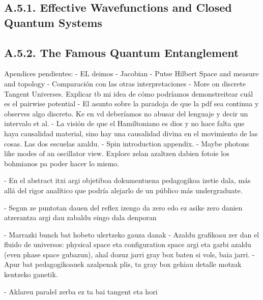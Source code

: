 \documentclass[11pt, a4paper]{article} %
\begin{document}
\subsection*{A.5.1. Effective Wavefunctions and Closed Quantum Systems}

\subsection*{A.5.2. The Famous Quantum Entanglement}

\newpage
Apendices pendientes:
- EL deimos
- Jacobian
- Putse Hilbert Space and measure and topology
- Comparación con las otras interpretaciones
- More on discrete Tangent Universes. Explicar tb mi idea de cómo podríamos demonstreitear cuál es el pairwise potential
- El asunto sobre la paradoja de que la pdf sea continua y observes algo discreto. Ke en vd deberíamos no abusar del lenguaje y decir un intervalo et al.
- La visión de que el Hamiltoniano es dios y no hace falta que haya causalidad material, sino hay una causalidad divina en el movimiento de las cosas. Las dos escuelas azaldu.
- Spin introduction appendix.
- Maybe photons like modes of an oscillator view. Explore zelan azaltzen dabien fotoie los bohmianos pa poder hacer lo mismo.

- En el abstract itxi argi objetiboa dokumentuena pedagogikoa izetie dala, más allá del rigor analítico que podría alejarlo de un público más undergraduate.

- Segun ze puntotan dauen del reflex izengo da zero edo ez asike zero danien atzerantza argi dau zabaldu eingo dala denporan


- Marrazki bunch bat hobeto ulertzeko gauza danak
- Azaldu grafikoau zer dan el fluido de universos: physical space eta configuration space argi eta garbi azaldu (even phase space gubazun), ahal dozuz jarri gray box baten si vols, baia jarri.
- Apur bat pedagogikoauek azalpenak plis, ta gray box gehiau detalle motzak kentzeko ganetik.

- Aklareu paralel zerba ez ta bai tangent eta hori
\end{document}
